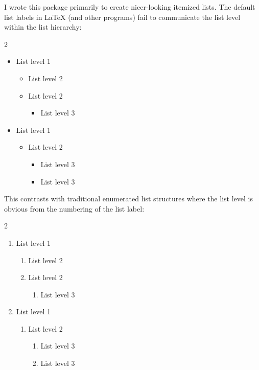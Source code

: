 \documentclass{beerydoc}
\begin{document}
I wrote this package primarily to create nicer-looking itemized lists.
The default list labels in \LaTeX{} (and other programs) fail to communicate
the list level within the list hierarchy:

\begin{multicols}{2}
  \begin{itemize}[label=\textbullet]
    \item List level 1
    \begin{itemize}[label=\textbf{--}]
      \item List level 2
      \item List level 2
      \begin{itemize}[label=\textasteriskcentered]
        \item List level 3
      \end{itemize}
    \end{itemize}
    \item List level 1
    \begin{itemize}[label=\textbf{--}]
      \item List level 2
      \begin{itemize}[label=\textasteriskcentered]
        \item List level 3
        \item List level 3
      \end{itemize}
    \end{itemize}
  \end{itemize}
\end{multicols}

This contrasts with traditional enumerated list structures where the list level
is obvious from the numbering of the list label:

\begin{multicols}{2}
  \begin{enumerate}
    \item List level 1
    \begin{enumerate}
      \item List level 2
      \item List level 2
      \begin{enumerate}
        \item List level 3
      \end{enumerate}
    \end{enumerate}
    \item List level 1
    \begin{enumerate}
      \item List level 2
      \begin{enumerate}
        \item List level 3
        \item List level 3
      \end{enumerate}
    \end{enumerate}
  \end{enumerate}
\end{multicols}
\end{document}
